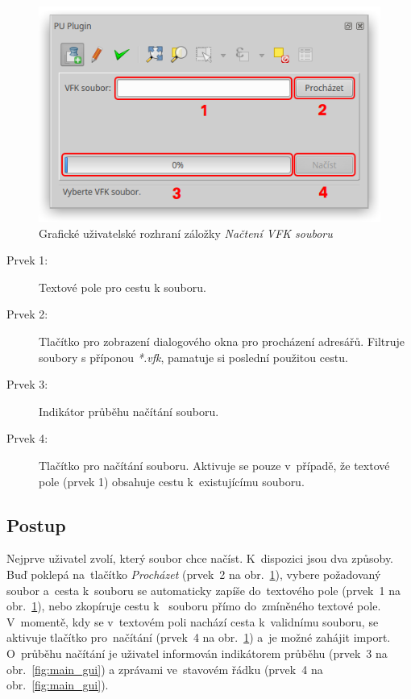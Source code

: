 	\begin{figure}[H]
		\centering
		\includegraphics[width=.55\textwidth]{./pictures/nacteni_vfk_gui.png}
		\caption[Grafické uživatelské rozhraní záložky \textit{Načtení VFK souboru}]{Grafické uživatelské rozhraní záložky \textit{Načtení VFK souboru}}
		\label{fig:nacteni_vfk_gui}
 	\end{figure}

\begin{description}
	\item[Prvek 1:] Textové pole pro cestu k  souboru.
	\item[Prvek 2:] Tlačítko pro zobrazení dialogového okna pro procházení adresářů. Filtruje soubory s příponou \textit{*.vfk}, pamatuje si poslední použitou cestu.
	\item[Prvek 3:] Indikátor průběhu načítání  souboru.
	\item[Prvek 4:] Tlačítko pro načítání  souboru. Aktivuje se pouze v~případě, že textové pole (prvek 1) obsahuje cestu k~existujícímu  souboru.
\end{description}

\subsection{Postup}
\label{postup_nacteni_vfk}

Nejprve uživatel zvolí, který  soubor chce načíst. K~dispozici jsou dva způsoby. Buď poklepá na~tlačítko \textit{Procházet} (prvek~2 na obr.~\ref{fig:nacteni_vfk_gui}), vybere požadovaný soubor a~cesta k~souboru se automaticky zapíše do~textového pole (prvek~1 na obr.~\ref{fig:nacteni_vfk_gui}), nebo zkopíruje cestu k~ souboru přímo do~zmíněného textové pole. V~momentě, kdy se v~textovém poli nachází cesta k~validnímu  souboru, se aktivuje tlačítko pro~načítání (prvek~4 na obr.~\ref{fig:nacteni_vfk_gui}) a~je možné zahájit import. O~průběhu načítání je uživatel informován indikátorem průběhu (prvek~3 na obr.~\ref{fig:main_gui}) a zprávami ve~stavovém řádku (prvek~4 na obr.~\ref{fig:main_gui}).

